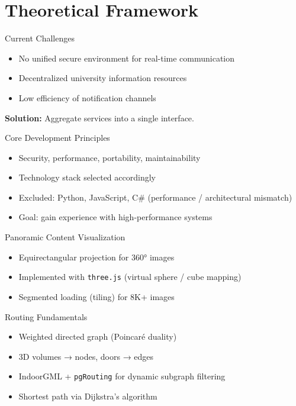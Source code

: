 \documentclass[10pt, aspectratio=169]{beamer}
\begin{document}
\section{Theoretical Framework}

\begin{frame}{Current Challenges}
	\begin{itemize}
		\item No unified secure environment for real-time communication
		\item Decentralized university information resources
		\item Low efficiency of notification channels
	\end{itemize}
	\vfill
	\textbf{Solution:} Aggregate services into a single interface.
\end{frame}

\begin{frame}{Core Development Principles}
	\begin{itemize}
		\item Security, performance, portability, maintainability
		\item Technology stack selected accordingly
		\item Excluded: Python, JavaScript, C\# (performance / architectural mismatch)
		\item Goal: gain experience with high-performance systems
	\end{itemize}
\end{frame}

\begin{frame}{Panoramic Content Visualization}
	\begin{itemize}
		\item Equirectangular projection for 360° images
		\item Implemented with \texttt{three.js} (virtual sphere / cube mapping)
		\item Segmented loading (tiling) for 8K+ images
	\end{itemize}
\end{frame}

\begin{frame}{Routing Fundamentals}
	\begin{itemize}
		\item Weighted directed graph (Poincaré duality)
		\item 3D volumes → nodes, doors → edges
		\item IndoorGML + \texttt{pgRouting} for dynamic subgraph filtering
		\item Shortest path via Dijkstra's algorithm
	\end{itemize}
\end{frame}
\end{document}
